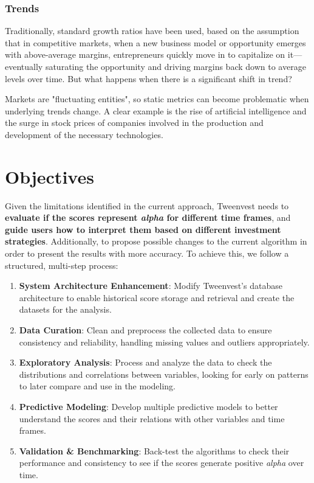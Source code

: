 \documentclass[11pt,english,a4paper,hidelinks]{book}
\begin{document}
\subsubsection{Trends}

\noindent Traditionally, standard growth ratios have been used, based on the assumption that in competitive markets, when a new business model or opportunity emerges with above-average margins, entrepreneurs quickly move in to capitalize on it—eventually saturating the opportunity and driving margins back down to average levels over time. But what happens when there is a significant shift in trend? 

\vspace{0.5cm}
\noindent Markets are "fluctuating entities", so static metrics can become problematic when underlying trends change. A clear example is the rise of artificial intelligence and the surge in stock prices of companies involved in the production and development of the necessary technologies.

\section{Objectives}

\noindent Given the limitations identified in the current approach, Tweenvest needs to \textbf{evaluate if the scores represent \textit{alpha} for different time frames}, and \textbf{guide users how to interpret them based on different investment strategies}. Additionally, to propose possible changes to the current algorithm in order to present the results with more accuracy. To achieve this, we follow a structured, multi-step process:

\begin{enumerate}
  \item \textbf{System Architecture Enhancement}: Modify Tweenvest's database architecture to enable historical score storage and retrieval and create the datasets for the analysis.
  \item \textbf{Data Curation}: Clean and preprocess the collected data to ensure consistency and reliability, handling missing values and outliers appropriately.
  \item \textbf{Exploratory Analysis}: Process and analyze the data to check the distributions and correlations between variables, looking for early on patterns to later compare and use in the modeling.
  \item \textbf{Predictive Modeling}: Develop multiple predictive models to better understand the scores and their relations with other variables and time frames.
  \item \textbf{Validation \& Benchmarking}: Back-test the algorithms to check their performance and consistency to see if the scores generate positive \textit{alpha} over time.
\end{enumerate}
\end{document}
